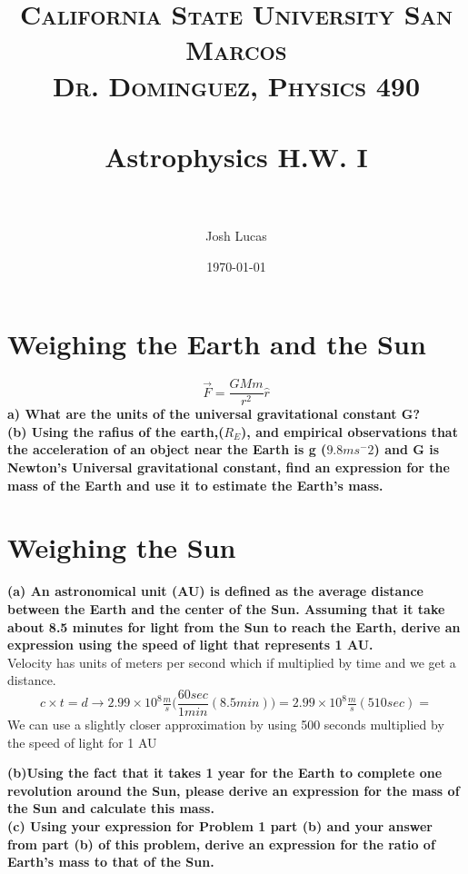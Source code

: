 \documentclass[paper=a4, fontsize=11pt]{scrartcl} %
\title{	
\normalfont \normalsize 
\textsc{California State University San Marcos \\ Dr. Dominguez, Physics 490} \\ [25pt] %
\horrule{0.5pt} \\[0.4cm] %
\huge Astrophysics H.W. I \\ %
\horrule{2pt} \\[0.5cm] %
}
\author{Josh Lucas} %
\date{\normalsize\today} %
\numberwithin{equation}{section} %
\numberwithin{figure}{section} %
\numberwithin{table}{section} %
\begin{document}
\maketitle %


\section{Weighing the Earth and the Sun}
\begin{equation}
\vec{F}= \frac{GMm}{r^2}\hat{r}
\end{equation}
\textbf{a) What are the units of the universal gravitational constant G?}\\

\textbf{(b) Using the rafius of the earth,($R_E$), and empirical observations that the acceleration of an object near the Earth is g ($9.8ms^-2$)  and G is Newton's  Universal gravitational constant, find an expression for the mass of the Earth and use it to estimate the Earth's mass.}

\section{Weighing the Sun}

\textbf{(a) An astronomical unit (AU) is defined as the average distance between the Earth and the
center of the Sun. Assuming that it take about 8.5 minutes for light from the Sun to reach the
Earth, derive an expression using the speed of light that represents 1 AU.}\\

Velocity has units of meters per second which if multiplied by time and we get a distance. 
\begin{equation*}
c \times t = d \rightarrow 2.99\times 10^8 \tfrac{m}{s} \bigg(\frac{60sec}{1 min}(8.5min)\bigg) = 2.99\times 10^8 \tfrac{m}{s} (510sec) =  
\end{equation*}
We can use a slightly closer approximation by using 500 seconds multiplied by the speed of light for 1 AU

\textbf{(b)Using the fact that it takes 1 year for the Earth to complete one revolution around
the Sun, please derive an expression for the mass of the Sun and calculate this mass.}\\
\textbf{(c) Using your expression for Problem 1 part (b) and your answer from part (b) of this
problem, derive an expression for the ratio of Earth's mass to that of the Sun.}
\end{document}
